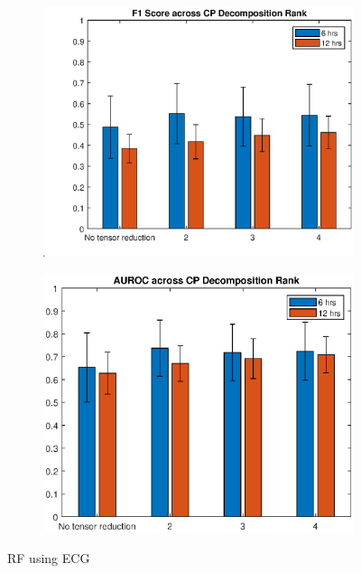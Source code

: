 \begin{figure}[htb]
    \centering
    \begin{subfigure}[htb]{0.49\textwidth}
        \includegraphics[width=\textwidth]{body/figures/ecgOnlyRF_f1.eps}
    \end{subfigure}
    \hfill
    \begin{subfigure}[htb]{0.49\textwidth}
        \includegraphics[width=\textwidth]{body/figures/ecgOnlyRF_auc.eps}
    \end{subfigure}
    \caption{RF using ECG}
    \label{fig:rf_ecgonly}
\end{figure}  %

